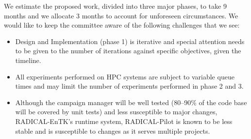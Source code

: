 We estimate the proposed work, divided into three major phases, to take 9 months 
and we allocate 3 months to account for unforeseen circumstances. We would like 
to keep the committee aware of the following challenges that we see:

\begin{itemize}
	\item Design and Implementation (phase 1) is iterative and special attention needs to be given to the number of iterations against specific objectives, given the timeline.
    \item All experiments performed on HPC systems are subject to variable queue times and may limit the number of experiments performed in phase 2 and 3.
	\item Although the campaign manager will be well tested (80--90\% of the code base will be covered by unit tests) and less susceptible to major changes, RADICAL-EnTK's runtime system, RADICAL-Pilot is known to be less stable and is susceptible to changes as it serves multiple projects.
\end{itemize}